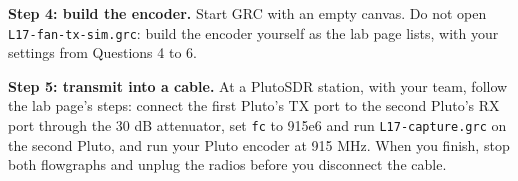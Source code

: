 \documentclass{exam}
\makeatletter
\def\keysol#1{\ifcsname keysol@#1\endcsname\csname keysol@#1\endcsname\fi}
\makeatother
\begin{document}
\begin{questions}
\begin{parts}
\end{parts}

\newpage
\question \textbf{Step 4: build the encoder.} Start GRC with an empty canvas. Do not
open \texttt{L17-fan-tx-sim.grc}: build the encoder yourself as the lab page lists,
with your settings from Questions 4 to 6.


\newpage
\question \textbf{Step 5: transmit into a cable.} At a PlutoSDR station, with your team,
follow the lab page's steps: connect the first Pluto's TX port to the second Pluto's RX port
through the 30 dB attenuator, set \texttt{fc} to 915e6 and run \texttt{L17-capture.grc}
on the second Pluto, and run your Pluto encoder at 915 MHz. When you finish, stop both flowgraphs and unplug the radios before
you disconnect the cable.


\end{questions}
\end{document}
